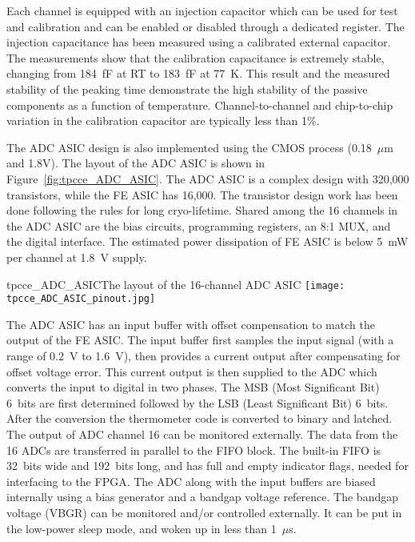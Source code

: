 Each channel is equipped with an injection capacitor which can be used
for test and calibration and can be enabled or disabled through a
dedicated register. The injection capacitance has been measured using 
a calibrated external capacitor. The measurements show
that the calibration capacitance is extremely stable, changing from
184~fF at RT to 183~fF at 77~K. This result and the measured
stability of the peaking time demonstrate the high stability of the
passive components as a function of temperature. Channel-to-channel and chip-to-chip
variation in the calibration capacitor are typically less than 1\%. 

The ADC ASIC design is also implemented using the CMOS process (0.18~$\mu$m and 1.8V).
The layout of the ADC ASIC is shown in Figure~\ref{fig:tpcce_ADC_ASIC}. 
The ADC ASIC is a complex design with 320,000 transistors, while the FE ASIC has 16,000.
The transistor design work has been done following the rules for long cryo-lifetime.
Shared among the 16 channels in the ADC ASIC are the bias circuits, programming registers,
an 8:1 MUX, and the digital interface.
The estimated power dissipation of FE ASIC is below 5~mW per channel at 1.8~V supply.
  

\begin{cdrfigure}{tpcce_ADC_ASIC}{The layout of the 16-channel ADC ASIC}
\texttt{[image: tpcce\_ADC\_ASIC\_pinout.jpg]} %
\end{cdrfigure}

The ADC ASIC has an input buffer with offset compensation to match the output of the FE ASIC.
The input buffer first samples the input signal (with a range of 0.2~V to 1.6~V),
then provides a current output after compensating for offset voltage error.
This current output is then supplied to the ADC which converts the input to digital in two phases.
The MSB (Most Significant Bit) 6~bits are first determined followed by the LSB (Least Significant Bit) 6~bits.
After the conversion the thermometer code is converted to binary and latched.
The output of ADC channel 16 can be monitored externally.
The data from the 16 ADCs are transferred in parallel to the FIFO block.
The built-in FIFO is 32~bits wide and 192~bits long,
and has full and empty indicator flags, needed for interfacing to the FPGA.
The ADC along with the input buffers are biased internally using a bias generator and a bandgap voltage reference.
The bandgap voltage (VBGR) can be monitored and/or controlled externally.
It can be put in the low-power sleep mode, and woken up in less than 1~$\mu$s.

